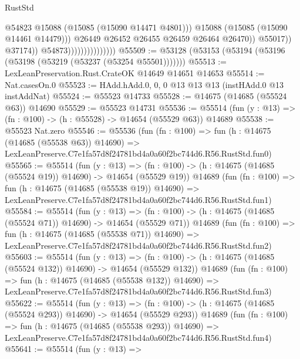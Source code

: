 \begin{lexlean}{RustStd}
\begin{coremodule}
                                                  @54823
                                                  @15088
                                                  (@15085 (@15090 @14471 @4801)))
                                                @15088
                                                (@15085 (@15090 @14461 @14479)))
                                              @26449
                                              @26452
                                              @26455
                                              @26459
                                              @26464
                                              @26470))
                                          @55017))
                                      @37174))
                                  @54873)))))))))))))))
@55509 := @53128 (@53153 (@53194 (@53196 (@53198 (@53219 (@53237 (@53254 @55501)))))))
@55513 := LexLeanPreservation.Rust.CrateOK @14649 @14651 @14653
@55514 := Nat.casesOn.{0}
@55523 := HAdd.hAdd.{0, 0, 0} @13 @13 @13 (instHAdd.{0} @13 instAddNat)
@55524 := @55523 @14733
@55528 := @14675 (@14685 (@55524 @63)) @14690
@55529 := @55523 @14731
@55536 := @55514 (fun (y : @13) => (fn : @100) -> (h : @55528) -> @14654 (@55529 @63)) @14689
@55538 := @55523 Nat.zero
@55546 := @55536
    (fun (fn : @100) =>
    fun (h : @14675 (@14685 (@55538 @63)) @14690) =>
    LexLeanPreserve.C7e1fa57d8f24781bd4a0a60f2bc744d6.R56.RustStd.fun0)
@55565 := @55514
    (fun (y : @13) =>
    (fn : @100) -> (h : @14675 (@14685 (@55524 @19)) @14690) -> @14654 (@55529 @19))
    @14689
    (fun (fn : @100) =>
    fun (h : @14675 (@14685 (@55538 @19)) @14690) =>
    LexLeanPreserve.C7e1fa57d8f24781bd4a0a60f2bc744d6.R56.RustStd.fun1)
@55584 := @55514
    (fun (y : @13) =>
    (fn : @100) -> (h : @14675 (@14685 (@55524 @71)) @14690) -> @14654 (@55529 @71))
    @14689
    (fun (fn : @100) =>
    fun (h : @14675 (@14685 (@55538 @71)) @14690) =>
    LexLeanPreserve.C7e1fa57d8f24781bd4a0a60f2bc744d6.R56.RustStd.fun2)
@55603 := @55514
    (fun (y : @13) =>
    (fn : @100) -> (h : @14675 (@14685 (@55524 @132)) @14690) -> @14654 (@55529 @132))
    @14689
    (fun (fn : @100) =>
    fun (h : @14675 (@14685 (@55538 @132)) @14690) =>
    LexLeanPreserve.C7e1fa57d8f24781bd4a0a60f2bc744d6.R56.RustStd.fun3)
@55622 := @55514
    (fun (y : @13) =>
    (fn : @100) -> (h : @14675 (@14685 (@55524 @293)) @14690) -> @14654 (@55529 @293))
    @14689
    (fun (fn : @100) =>
    fun (h : @14675 (@14685 (@55538 @293)) @14690) =>
    LexLeanPreserve.C7e1fa57d8f24781bd4a0a60f2bc744d6.R56.RustStd.fun4)
@55641 := @55514
    (fun (y : @13) =>

\end{coremodule}
\end{lexlean}
